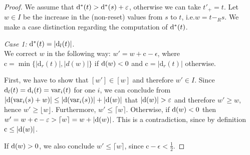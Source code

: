 \documentclass[fleqn,envcountsame]{LMCS}
\newcommand{\ie}{i.e.\xspace}
\newcommand{\floor}[1]{\ensuremath{\lfloor #1 \rfloor}}
\newcommand{\ceil}[1]{\ensuremath{\lceil #1 \rceil}}
\newcommand{\corr}{\ensuremath{\mathrm{c}}}
\newcommand{\dleft}{\ensuremath{\mathrm{d}_l}}
\newcommand{\dright}{\ensuremath{\mathrm{d}_r}}
\begin{document}
\begin{proof}
We assume that $\mathrm{d^*}(t) > \mathrm{d^*}(s) + \varepsilon$,
otherwise we can take $t'_+ = t$.
Let $w \in I$ be the increase in the (non-reset) values from $s$ to $t$, \ie $w = t -_R s$.
We make a case distinction regarding the computation of $\mathrm{d^*}(t)$.

\textit{Case 1:} $\dih(t)=|\dleft(t)|$.\\
We correct $w$ in the following way: $w' = w + \corr -\epsilon$, where
$\corr = \min\{|\dright(t)|, |d(w)|\}$ if $\mathrm{d}(w)<0$ and $\corr = |\dright(t)|$
otherwise.

First, we have to show that $[w'] \in [w]$ and therefore $w' \in I$.
Since $\dleft(t) = \di_i(t)= \var_i(t)$ for one $i$, 
we can conclude from $|\mathrm{d}(\mathrm{var}_i(s)+w)| \leq |\mathrm{d}(\mathrm{var}_i(s))| + |\mathrm{d}(w)|$
that $|\mathrm{d}(w)| > \varepsilon$ and therefore $w' \geq w$,
hence $w' \geq \floor{w}$.
Furthermore, $w'\leq \ceil{w}$. Otherwise, if $\mathrm{d}(w) < 0$ then
$w' =  w + \corr - \epsilon > \ceil{w} = w + |\di(w)|$. This is a
contradiction, since by definition $\corr \leq |\di(w)|$.

If $\mathrm{d}(w) > 0$, we also conclude $w'\leq \ceil{w}$, since 
$\corr - \epsilon < \frac 1 2$.


\end{proof}
\end{document}
